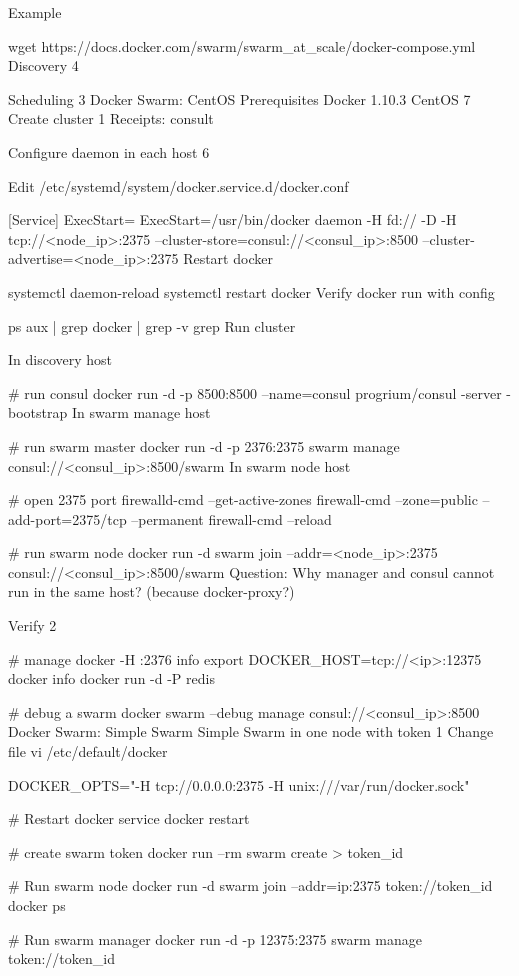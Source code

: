 Example

wget https://docs.docker.com/swarm/swarm_at_scale/docker-compose.yml
Discovery 4


Scheduling 3
Docker Swarm: CentOS
Prerequisites
Docker 1.10.3
CentOS 7
Create cluster 1
Receipts: consult

Configure daemon in each host 6

Edit /etc/systemd/system/docker.service.d/docker.conf

[Service]
ExecStart=
ExecStart=/usr/bin/docker daemon -H fd:// -D -H tcp://<node_ip>:2375 --cluster-store=consul://<consul_ip>:8500 --cluster-advertise=<node_ip>:2375
Restart docker

systemctl daemon-reload
systemctl restart docker
Verify docker run with config

ps aux | grep docker | grep -v grep
Run cluster

In discovery host

# run consul
docker run -d -p 8500:8500 --name=consul progrium/consul -server -bootstrap
In swarm manage host

# run swarm master
docker run -d -p 2376:2375 swarm manage consul://<consul_ip>:8500/swarm
In swarm node host

# open 2375 port
firewalld-cmd --get-active-zones
firewall-cmd --zone=public --add-port=2375/tcp --permanent
firewall-cmd --reload

# run swarm node
docker run -d swarm join --addr=<node_ip>:2375 consul://<consul_ip>:8500/swarm
Question: Why manager and consul cannot run in the same host? (because docker-proxy?)

Verify 2

# manage
docker -H :2376 info
export DOCKER_HOST=tcp://<ip>:12375
docker info
docker run -d -P redis

# debug a swarm
docker swarm --debug manage consul://<consul_ip>:8500
Docker Swarm: Simple Swarm
Simple Swarm in one node with token 1
Change file vi /etc/default/docker

DOCKER_OPTS="-H tcp://0.0.0.0:2375 -H unix:///var/run/docker.sock"

# Restart docker
service docker restart

# create swarm token
docker run --rm swarm create
> token_id

# Run swarm node
docker run -d swarm join --addr=ip:2375 token://token_id
docker ps

# Run swarm manager
docker run -d -p 12375:2375 swarm manage token://token_id

